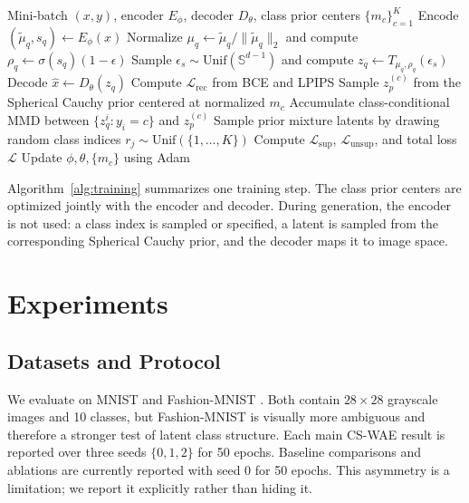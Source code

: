 \documentclass[10pt]{article}
\begin{document}
\begin{algorithm}[t]
\caption{CS-WAE training step}
\label{alg:training}
\begin{algorithmic}[1]
\Require Mini-batch $(x,y)$, encoder $E_\phi$, decoder $D_\theta$, class prior centers $\{m_c\}_{c=1}^{K}$
\State Encode $(\tilde{\mu}_q,s_q)\leftarrow E_\phi(x)$
\State Normalize $\mu_q\leftarrow \tilde{\mu}_q/\|\tilde{\mu}_q\|_2$ and compute $\rho_q\leftarrow \sigma(s_q)(1-\epsilon)$
\State Sample $\epsilon_s\sim\mathrm{Unif}(\mathbb{S}^{d-1})$ and compute $z_q\leftarrow T_{\mu_q,\rho_q}(\epsilon_s)$
\State Decode $\hat{x}\leftarrow D_\theta(z_q)$
\State Compute $\mathcal{L}_{\mathrm{rec}}$ from BCE and LPIPS
    \State Sample $z_p^{(c)}$ from the Spherical Cauchy prior centered at normalized $m_c$
    \State Accumulate class-conditional MMD between $\{z_q^i:y_i=c\}$ and $z_p^{(c)}$
\EndFor
\State Sample prior mixture latents by drawing random class indices $r_j\sim\mathrm{Unif}(\{1,\dots,K\})$
\State Compute $\mathcal{L}_{\mathrm{sup}}$, $\mathcal{L}_{\mathrm{unsup}}$, and total loss $\mathcal{L}$
\State Update $\phi,\theta,\{m_c\}$ using Adam
\end{algorithmic}
\end{algorithm}

Algorithm~\ref{alg:training} summarizes one training step. The class prior centers are optimized jointly with the encoder and decoder. During generation, the encoder is not used: a class index is sampled or specified, a latent is sampled from the corresponding Spherical Cauchy prior, and the decoder maps it to image space.

\section{Experiments}

\subsection{Datasets and Protocol}

We evaluate on MNIST \citep{lecun1998gradient} and Fashion-MNIST \citep{xiao2017fashion}. Both contain $28\times 28$ grayscale images and 10 classes, but Fashion-MNIST is visually more ambiguous and therefore a stronger test of latent class structure. Each main CS-WAE result is reported over three seeds $\{0,1,2\}$ for 50 epochs. Baseline comparisons and ablations are currently reported with seed 0 for 50 epochs. This asymmetry is a limitation; we report it explicitly rather than hiding it.
\end{document}
